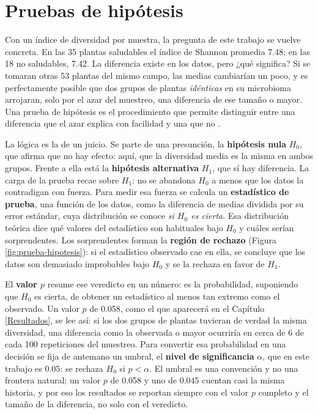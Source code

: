 \section{Pruebas de hipótesis}
\label{sec:pruebas_hipotesis}

Con un índice de diversidad por muestra, la pregunta de este trabajo se vuelve concreta. En las
35 plantas saludables el índice de Shannon promedia 7.48; en las 18 no saludables, 7.42. La
diferencia existe en los datos, pero ¿qué significa? Si se tomaran otras 53 plantas del mismo
campo, las medias cambiarían un poco, y es perfectamente posible que dos grupos de plantas
\emph{idénticas} en su microbioma arrojaran, solo por el azar del muestreo, una diferencia de ese
tamaño o mayor. Una prueba de hipótesis es el procedimiento que permite distinguir entre una
diferencia que el azar explica con facilidad y una que no
\citep{wackerly2002estadistica, larsen2005introduction}.

La lógica es la de un juicio. Se parte de una presunción, la \textbf{hipótesis nula} $H_0$, que
afirma que no hay efecto: aquí, que la diversidad media es la misma en ambos grupos. Frente a ella
está la \textbf{hipótesis alternativa} $H_1$, que sí hay diferencia. La carga de la prueba recae
sobre $H_1$: no se abandona $H_0$ a menos que los datos la contradigan con fuerza. Para medir esa
fuerza se calcula un \textbf{estadístico de prueba}, una función de los datos, como la diferencia
de medias dividida por su error estándar, cuya distribución se conoce \emph{si $H_0$ es cierta}.
Esa distribución teórica dice qué valores del estadístico son habituales bajo $H_0$ y cuáles
serían sorprendentes. Los sorprendentes forman la \textbf{región de rechazo}
(Figura \ref{fig:prueba-hipotesis}): si el estadístico observado cae en ella, se concluye que los
datos son demasiado improbables bajo $H_0$ y se la rechaza en favor de $H_1$.

El \textbf{valor $p$} resume ese veredicto en un número: es la probabilidad, suponiendo que $H_0$
es cierta, de obtener un estadístico al menos tan extremo como el observado. Un valor $p$ de 0.058,
como el que aparecerá en el Capítulo \ref{Resultados}, se lee así: si los dos grupos de plantas
tuvieran de verdad la misma diversidad, una diferencia como la observada o mayor ocurriría en
cerca de 6 de cada 100 repeticiones del muestreo. Para convertir esa probabilidad en una decisión se
fija de antemano un umbral, el \textbf{nivel de significancia} $\alpha$, que en este trabajo es 0.05:
se rechaza $H_0$ si $p < \alpha$. El umbral es una convención y no una frontera natural; un valor
$p$ de 0.058 y uno de 0.045 cuentan casi la misma historia, y por eso los resultados se reportan
siempre con el valor $p$ completo y el tamaño de la diferencia, no solo con el veredicto.

